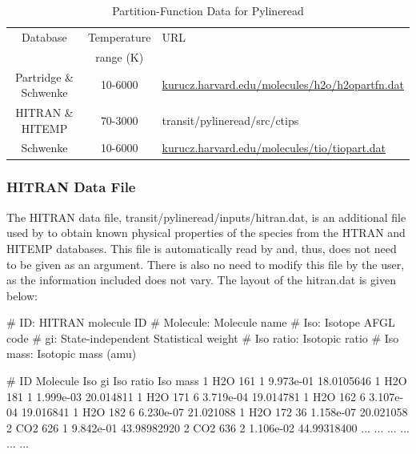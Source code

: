 \documentclass[letterpaper, 12pt]{article}
\begin{document}
\begin{table}[ht]
\centering
\caption{Partition-Function Data for Pylineread}
\label{table:PFs}
\begin{tabular}{ccl}
\hline
\hline
Database              & Temperature & URL \\
                      & range (K) &       \\
\hline
Partridge \& Schwenke & 10-6000   & \href{http://kurucz.harvard.edu/molecules/h2o/h2opartfn.dat}{kurucz.harvard.edu/molecules/h2o/h2opartfn.dat} \\
HITRAN \& HITEMP      & 70-3000   & transit/pylineread/src/ctips \\
Schwenke              & 10-6000   & \href{http://kurucz.harvard.edu/molecules/tio/tiopart.dat}{kurucz.harvard.edu/molecules/tio/tiopart.dat} \\
\hline
\end{tabular}
\end{table}


\subsubsection{HITRAN Data File}

The HITRAN data file, {\tttm transit/pylineread/inputs/hitran.dat},
is an additional file used by {\pylineread} to obtain known physical
properties of the species from the HTRAN and HITEMP databases.  This
file is automatically read by {\pylineread} and, thus, does not need
to be given as an argument.  There is also no need to modify this file
by the user, as the information included does not vary.  The layout of
the {\tttm hitran.dat} is given below: \newline

\begin{plain}
# ID:         HITRAN molecule ID
# Molecule:   Molecule name
# Iso:        Isotope AFGL code
# gi:         State-independent Statistical weight
# Iso ratio:  Isotopic ratio
# Iso mass:   Isotopic mass (amu)

# ID Molecule Iso        gi         Iso ratio    Iso mass
 1   H2O      161         1         9.973e-01    18.0105646
 1   H2O      181         1         1.999e-03    20.014811
 1   H2O      171         6         3.719e-04    19.014781
 1   H2O      162         6         3.107e-04    19.016841
 1   H2O      182         6         6.230e-07    21.021088
 1   H2O      172        36         1.158e-07    20.021058
 2   CO2      626         1         9.842e-01    43.98982920
 2   CO2      636         2         1.106e-02    44.99318400
...  ...      ...        ...           ...           ...
\end{plain}
\end{document}
